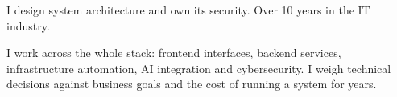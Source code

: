 
\begin{cvparagraph}
I design system architecture and own its security. Over 10 years in the IT industry.

I work across the whole stack: frontend interfaces, backend services, infrastructure automation, AI integration and cybersecurity. I weigh technical decisions against business goals and the cost of running a system for years.
\end{cvparagraph}
